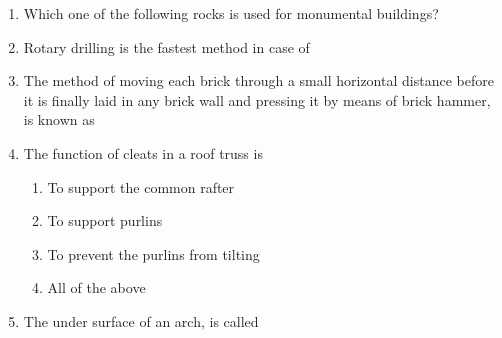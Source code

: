 \documentclass[11pt,a4paper]{article}
\begin{document}
\begin{enumerate}
\begin{enumerate*}[itemjoin=\qquad, label=\Alph*.]
\end{enumerate*}
\item{Which one of the following rocks is used for monumental buildings?}
\\
\item{Rotary drilling is the fastest method in case of}
\\
\item{The method of moving each brick through a small horizontal distance before it is finally laid in any brick wall and pressing it by means of brick hammer, is known as}
\\
\item{The function of cleats in a roof truss is}
\begin{enumerate}[label=\Alph*.]
\item{To support the common rafter}
\item{To support purlins}
\item{To prevent the purlins from tilting}
\item{All of the above}
\end{enumerate}
\item{The under surface of an arch, is called}
\\
\end{enumerate}
\end{document}
